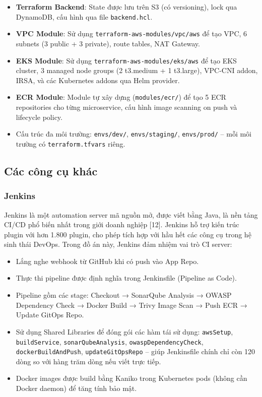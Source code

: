 \documentclass[13pt,a4paper,twoside]{extarticle}
\begin{document}
\begin{itemize}[leftmargin=*,nosep]
  \item \textbf{Terraform Backend}: State được lưu trên S3 (có versioning), lock qua DynamoDB, cấu hình qua file \texttt{backend.hcl}.
  \item \textbf{VPC Module}: Sử dụng \texttt{terraform-aws-modules/vpc/aws} để tạo VPC, 6 subnets (3 public + 3 private), route tables, NAT Gateway.
  \item \textbf{EKS Module}: Sử dụng \texttt{terraform-aws-modules/eks/aws} để tạo EKS cluster, 3 managed node groups (2 t3.medium + 1 t3.large), VPC-CNI addon, IRSA, và các Kubernetes addons qua Helm provider.
  \item \textbf{ECR Module}: Module tự xây dựng (\texttt{modules/ecr/}) để tạo 5 ECR repositories cho từng microservice, cấu hình image scanning on push và lifecycle policy.
  \item Cấu trúc đa môi trường: \texttt{envs/dev/}, \texttt{envs/staging/}, \texttt{envs/prod/} -- mỗi môi trường có \texttt{terraform.tfvars} riêng.
\end{itemize}

\subsection{Các công cụ khác}

\subsubsection{Jenkins}

Jenkins là một automation server mã nguồn mở, được viết bằng Java, là nền tảng CI/CD phổ biến nhất trong giới doanh nghiệp [12]. Jenkins hỗ trợ kiến trúc plugin với hơn 1.800 plugin, cho phép tích hợp với hầu hết các công cụ trong hệ sinh thái DevOps. Trong đồ án này, Jenkins đảm nhiệm vai trò CI server:

\begin{itemize}[leftmargin=*,nosep]
  \item Lắng nghe webhook từ GitHub khi có push vào App Repo.
  \item Thực thi pipeline được định nghĩa trong Jenkinsfile (Pipeline as Code).
  \item Pipeline gồm các stage: Checkout → SonarQube Analysis → OWASP Dependency Check → Docker Build → Trivy Image Scan → Push ECR → Update GitOps Repo.
  \item Sử dụng Shared Libraries để đóng gói các hàm tái sử dụng: \texttt{awsSetup}, \texttt{buildService}, \texttt{sonarQubeAnalysis}, \texttt{owaspDependencyCheck}, \texttt{dockerBuildAndPush}, \texttt{updateGitOpsRepo} -- giúp Jenkinsfile chính chỉ còn 120 dòng so với hàng trăm dòng nếu viết trực tiếp.
  \item Docker images được build bằng Kaniko trong Kubernetes pods (không cần Docker daemon) để tăng tính bảo mật.
\end{itemize}
\end{document}

